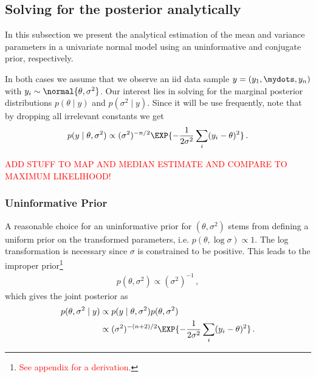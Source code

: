 \subsection{Solving for the posterior analytically}
In this subsection we present the analytical estimation of the mean and variance parameters
in a univariate normal model using an uninformative and conjugate prior, respectively.

In both cases we assume that we observe an iid data sample $y = (y_1, \mydots, y_n)$
with $y_i \sim \normal{\theta, \sigma^2}$. Our interest lies in solving for the
marginal posterior distributions $p(\theta \mid y)$ and $p(\sigma^2 \mid y)$.
Since it will be use frequently, note that by dropping all irrelevant constants we get
\begin{align}
  p(y \mid \theta, \sigma^2) \propto (\sigma^2)^{-n/2} \EXP{-\frac{1}{2\sigma^2}\sum_i (y_i - \theta)^2} \,.
\end{align}

\textcolor{red}{ADD STUFF TO MAP AND MEDIAN ESTIMATE AND COMPARE TO MAXIMUM LIKELIHOOD!}

\subsubsection*{Uninformative Prior}
A reasonable choice for an uninformative prior for $(\theta, \sigma^2)$ stems
from defining a uniform prior on the transformed parameters, i.e. $p(\theta, \log \sigma) \propto 1$.
The log transformation is necessary since $\sigma$ is constrained to be positive.
This leads to the improper prior\footnote{\textcolor{red}{See appendix for a derivation.}}
\begin{align}
  p(\theta, \sigma^2) \propto (\sigma^2)^{-1} \,,
\end{align}
which gives the joint posterior as
\begin{align}
  p(\theta, \sigma^2 \mid y) &\propto p(y \mid \theta, \sigma^2) p(\theta, \sigma^2)\\
  &\propto (\sigma^2)^{-(n+2)/2} \EXP{-\frac{1}{2\sigma^2}\sum_i (y_i - \theta)^2} \,.
\end{align}

